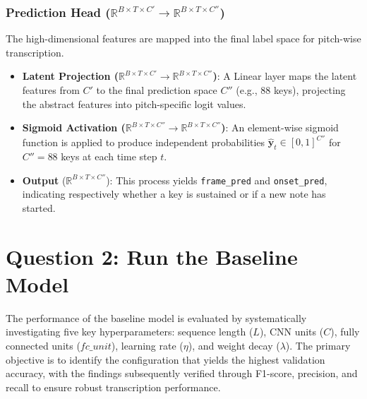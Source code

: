 \documentclass{article}
\begin{document}
\subsubsection[Prediction Head]{Prediction Head ($\mathbb{R}^{B \times T \times C'} \rightarrow \mathbb{R}^{B \times T \times C''}$)}
The high-dimensional features are mapped into the final label space for pitch-wise transcription.
\begin{itemize}
    \item \textbf{Latent Projection ($\mathbb{R}^{B \times T \times C'} \rightarrow \mathbb{R}^{B \times T \times C''}$)}: A Linear layer maps the latent features from $C'$ to the final prediction space $C''$ (e.g., 88 keys), projecting the abstract features into pitch-specific logit values.
    \item \textbf{Sigmoid Activation ($\mathbb{R}^{B \times T \times C''} \rightarrow \mathbb{R}^{B \times T \times C''}$)}: An element-wise sigmoid function is applied to produce independent probabilities $\hat{\mathbf{y}}_t \in [0, 1]^{C''}$ for $C''=88$ keys at each time step $t$.
    \item \textbf{Output} ($\mathbb{R}^{B \times T \times C''}$): This process yields \texttt{frame\_pred} and \texttt{onset\_pred}, indicating respectively whether a key is sustained or if a new note has started.
\end{itemize}


\section{Question 2: Run the Baseline Model}
The performance of the baseline model is evaluated by systematically investigating five key hyperparameters: sequence length ($L$), CNN units ($C$), fully connected units ($fc\_unit$), learning rate ($\eta$), and weight decay ($\lambda$). The primary objective is to identify the configuration that yields the highest validation accuracy, with the findings subsequently verified through F1-score, precision, and recall to ensure robust transcription performance.
\end{document}

